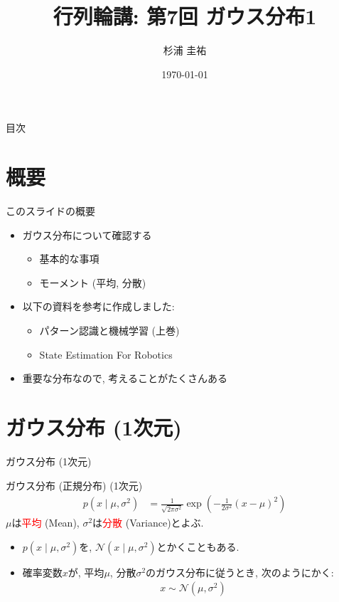 \documentclass[dvipdfmx,notheorems,t]{beamer}
\title{行列輪講: 第7回 ガウス分布1}
\author{杉浦 圭祐}
\institute[松谷研究室]{慶應義塾大学理工学部情報工学科 松谷研究室}
\date{\today}
\begin{document}
\linespread{1.1}

\frame{\titlepage}

\section{}

\begin{frame}{目次}
\tableofcontents
\end{frame}

\section{概要}

\begin{frame}{このスライドの概要}
\begin{itemize}
  \item ガウス分布について確認する
  \begin{itemize}
    \item 基本的な事項
    \item モーメント (平均, 分散)
  \end{itemize}
  \item 以下の資料を参考に作成しました:
  \begin{itemize}
    \item パターン認識と機械学習 (上巻)
    \item State Estimation For Robotics
  \end{itemize}
  \item 重要な分布なので, 考えることがたくさんある
\end{itemize}
\end{frame}

\section{ガウス分布 (1次元)}

\begin{frame}{ガウス分布 (1次元)}
\begin{block}{ガウス分布 (正規分布) (1次元)}
  \begin{align*}
    p(x \mid \mu, \sigma^2)
      &= \frac{1}{\sqrt{2 \pi \sigma^2}}
      \exp \left( -\frac{1}{2 \sigma^2} \left( x - \mu \right)^2 \right)
  \end{align*}
  $\mu$は\textcolor{red}{平均} (Mean), $\sigma^2$は\textcolor{red}{分散} (Variance)とよぶ.
\end{block}

\begin{itemize}
  \item $p(x \mid \mu, \sigma^2)$を, $\mathcal{N}(x \mid \mu, \sigma^2)$とかくこともある.
  \item 確率変数$x$が, 平均$\mu$, 分散$\sigma^2$のガウス分布に従うとき, 次のようにかく:
  \begin{align*}
    x \sim \mathcal{N}(\mu, \sigma^2)
  \end{align*}
\end{itemize}
\end{frame}
\end{document}
